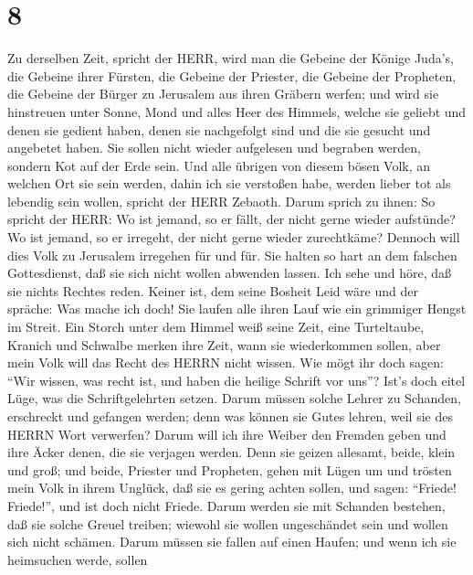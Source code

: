 \hypertarget{section-7}{%
\section{8}\label{section-7}}

 Zu derselben Zeit, spricht der HERR, wird man die Gebeine
der Könige Juda's, die Gebeine ihrer Fürsten, die Gebeine der Priester,
die Gebeine der Propheten, die Gebeine der Bürger zu Jerusalem aus ihren
Gräbern werfen;  und wird sie hinstreuen unter Sonne, Mond
und alles Heer des Himmels, welche sie geliebt und denen sie gedient
haben, denen sie nachgefolgt sind und die sie gesucht und angebetet
haben. Sie sollen nicht wieder aufgelesen und begraben werden, sondern
Kot auf der Erde sein.  Und alle übrigen von diesem bösen
Volk, an welchen Ort sie sein werden, dahin ich sie verstoßen habe,
werden lieber tot als lebendig sein wollen, spricht der HERR Zebaoth.
 Darum sprich zu ihnen: So spricht der HERR: Wo ist jemand,
so er fällt, der nicht gerne wieder aufstünde? Wo ist jemand, so er
irregeht, der nicht gerne wieder zurechtkäme?  Dennoch will
dies Volk zu Jerusalem irregehen für und für. Sie halten so hart an dem
falschen Gottesdienst, daß sie sich nicht wollen abwenden lassen.
 Ich sehe und höre, daß sie nichts Rechtes reden. Keiner
ist, dem seine Bosheit Leid wäre und der spräche: Was mache ich doch!
Sie laufen alle ihren Lauf wie ein grimmiger Hengst im Streit.
 Ein Storch unter dem Himmel weiß seine Zeit, eine
Turteltaube, Kranich und Schwalbe merken ihre Zeit, wann sie
wiederkommen sollen, aber mein Volk will das Recht des HERRN nicht
wissen.  Wie mögt ihr doch sagen: ``Wir wissen, was recht
ist, und haben die heilige Schrift vor uns''? Ist's doch eitel Lüge, was
die Schriftgelehrten setzen.  Darum müssen solche Lehrer zu
Schanden, erschreckt und gefangen werden; denn was können sie Gutes
lehren, weil sie des HERRN Wort verwerfen?  Darum will ich
ihre Weiber den Fremden geben und ihre Äcker denen, die sie verjagen
werden. Denn sie geizen allesamt, beide, klein und groß; und beide,
Priester und Propheten, gehen mit Lügen um  und trösten
mein Volk in ihrem Unglück, daß sie es gering achten sollen, und sagen:
``Friede! Friede!'', und ist doch nicht Friede.  Darum
werden sie mit Schanden bestehen, daß sie solche Greuel treiben; wiewohl
sie wollen ungeschändet sein und wollen sich nicht schämen. Darum müssen
sie fallen auf einen Haufen; und wenn ich sie heimsuchen werde, sollen
